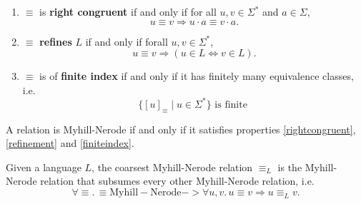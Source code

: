 \begin{definition} $ $ 

\begin{enumerate}[label=(\roman*)]

    \item\label{rightcongruent}
        $\equiv$ is \textbf{right congruent} if and only if for all $u, v \in \Sigma^*$ and $a \in \Sigma$,
        \begin{equation*}
            u \equiv v \Rightarrow
            u \cdot a \equiv v \cdot a.
        \end{equation*}


    \item\label{refinement}
        $\equiv$ \textbf{refines} $L$ if and only if forall $u,v \in \Sigma^*$,
        \begin{equation*}
            u \equiv v \Rightarrow
            (u \in L \iff v \in L).
        \end{equation*}

    \item\label{finiteindex}
        $\equiv$ is of \textbf{finite index} if and only if it has finitely many equivalence classes, i.e.
        \begin{equation*}
            \{[u]_\equiv \; | \; u \in \Sigma^*\} \mbox{ is finite }
        \end{equation*}

\end{enumerate}
\end{definition}

\begin{definition}
    \label{MN_relation}
    A relation is Myhill-Nerode if and only if it satisfies properties \ref{rightcongruent}, \ref{refinement} and \ref{finiteindex}.
\end{definition}


\begin{definition}
Given a language $L$, the coarsest Myhill-Nerode relation $\equiv_L$ is the Myhill-Nerode relation that subsumes every other Myhill-Nerode relation, i.e.
\begin{equation*}
    \forall \equiv. \, \equiv \mathrm{Myhill-Nerode} -> \forall u,v. \, u \equiv v \Rightarrow u \equiv_L v.
\end{equation*}
\end{definition}

